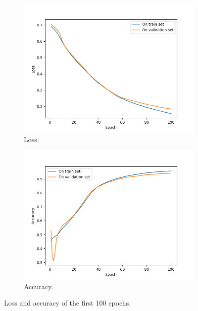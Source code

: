 \documentclass[12pt, a4paper]{article}
\begin{document}
\begin{multicols}{2}
	\begin{figure}[h!]
	  \centering
	  \begin{subfigure}[b]{0.45\linewidth}
	    \includegraphics[width=\linewidth]{Figure_1.png}
	    \caption{Loss.}
	  \end{subfigure}
	  \begin{subfigure}[b]{0.45\linewidth}
	    \includegraphics[width=\linewidth]{Figure_2.png}
	    \caption{Accuracy.}
	  \end{subfigure}
	  \caption{Loss and accuracy of the first 100 epochs.}
	  \label{fig:training}
	\end{figure}


\end{multicols}
\end{document}
